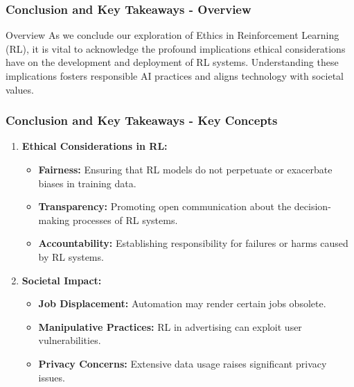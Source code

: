 \documentclass{beamer}
\begin{document}
\begin{frame}[fragile]
    \frametitle{Conclusion and Key Takeaways - Overview}
    \begin{block}{Overview}
        As we conclude our exploration of Ethics in Reinforcement Learning (RL), it is vital to acknowledge the profound implications ethical considerations have on the development and deployment of RL systems. Understanding these implications fosters responsible AI practices and aligns technology with societal values.
    \end{block}
\end{frame}

\begin{frame}[fragile]
    \frametitle{Conclusion and Key Takeaways - Key Concepts}
    \begin{enumerate}
        \item \textbf{Ethical Considerations in RL:}
            \begin{itemize}
                \item \textbf{Fairness:} Ensuring that RL models do not perpetuate or exacerbate biases in training data.
                \item \textbf{Transparency:} Promoting open communication about the decision-making processes of RL systems.
                \item \textbf{Accountability:} Establishing responsibility for failures or harms caused by RL systems.
            \end{itemize}
    
        \item \textbf{Societal Impact:} 
            \begin{itemize}
                \item \textbf{Job Displacement:} Automation may render certain jobs obsolete.
                \item \textbf{Manipulative Practices:} RL in advertising can exploit user vulnerabilities.
                \item \textbf{Privacy Concerns:} Extensive data usage raises significant privacy issues.
            \end{itemize}
    \end{enumerate}
\end{frame}
\end{document}
